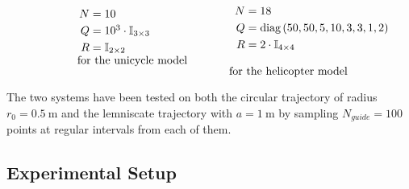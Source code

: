 \documentclass[../main.tex]{subfiles}
\begin{document}
\[
\begin{minipage}{.2\textwidth}
\end{minipage}%
\begin{minipage}{.3\textwidth}
  $\begin{array}{r@{{}\mathrel{=}{}}l}
	  N & 10 \\[\jot]
	  Q & 10^3 \cdot \mbb{I}_{3 \times 3} \\[\jot]
	  R & \mbb{I}_{2 \times 2}
  \end{array}$\\
	\vspace{0.25cm}
  \text{for the unicycle model}
\end{minipage}%
\begin{minipage}{.10\textwidth}
\quad
\end{minipage}%
\begin{minipage}{.3\textwidth}
  $\begin{array}{r@{{}\mathrel{=}{}}l}
	N & 18 \\[\jot] 
	Q & \text{diag}\left(50, 50, 5, 10, 3, 3, 1, 2\right) \\[\jot]
	R & 2 \cdot \mbb{I}_{4 \times 4}
  \end{array}$\\
  \vspace{0.25cm}
  \text{for the helicopter model}
\end{minipage}%
\]

The two systems have been tested on both the circular trajectory of radius $r_0
= \SI{0.5}{\meter}$ and the lemniscate trajectory with $a = \SI{1}{\meter}$ by sampling $N_{guide} = 100$ points at regular intervals from each of them.

\subsection{Experimental Setup}\label{sec:setup}
\end{document}
